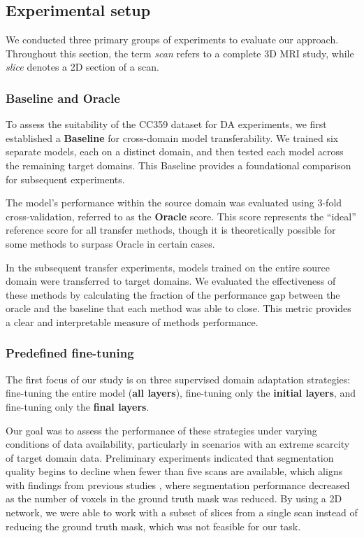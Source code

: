 \subsection{Experimental setup}
\label{sec:mri:exp:setup}

We conducted three primary groups of experiments to evaluate our approach. Throughout this section, the term \textit{scan} refers to a complete 3D MRI study, while \textit{slice} denotes a 2D section of a scan.


\subsubsection{Baseline and Oracle}

To assess the suitability of the CC359 dataset for DA experiments, we first established a \textbf{Baseline} for cross-domain model transferability. We trained six separate models, each on a distinct domain, and then tested each model across the remaining target domains. This Baseline provides a foundational comparison for subsequent experiments.

The model's performance within the source domain was evaluated using 3-fold cross-validation, referred to as the \textbf{Oracle} score. This score represents the ``ideal'' reference score for all transfer methods, though it is theoretically possible for some methods to surpass Oracle in certain cases.

In the subsequent transfer experiments, models trained on the entire source domain were transferred to target domains. We evaluated the effectiveness of these methods by calculating the fraction of the performance gap between the oracle and the baseline that each method was able to close. This metric provides a clear and interpretable measure of methods performance.


\subsubsection{Predefined fine-tuning}

The first focus of our study is on three supervised domain adaptation strategies: fine-tuning the entire model (\textbf{all layers}), fine-tuning only the \textbf{initial layers}, and fine-tuning only the \textbf{final layers}.

Our goal was to assess the performance of these strategies under varying conditions of data availability, particularly in scenarios with an extreme scarcity of target domain data. Preliminary experiments indicated that segmentation quality begins to decline when fewer than five scans are available, which aligns with findings from previous studies \cite{valverde2019one}, where segmentation performance decreased as the number of voxels in the ground truth mask was reduced. By using a 2D network, we were able to work with a subset of slices from a single scan instead of reducing the ground truth mask, which was not feasible for our task.

